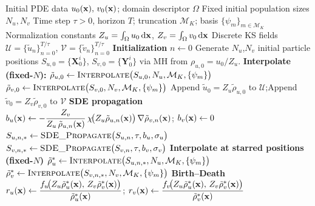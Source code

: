 \documentclass[preprint,12pt]{elsarticle}
\theoremstyle{definition}
\theoremstyle{remark}
\begin{document}
\begin{algorithm}
\caption{Stochastic Branching for keller--Segel equation}\label{alg:ks}
\begin{algorithmic}
\Require Initial PDE data $u_0(\mathbf{x}),\,v_0(\mathbf{x})$; domain descriptor $\Omega$
\Require Fixed initial population sizes $N_u, N_v$
\Require Time step $\tau>0$, horizon $T$; truncation $\mathcal M_K$; basis $\{\psi_m\}_{m\in\mathcal M_K}$
\Require Normalization constants $Z_u=\int_\Omega u_0\,\mathrm d\mathbf{x}$, $Z_v=\int_\Omega v_0\,\mathrm d\mathbf{x}$
\Ensure Discrete KS fields $\mathcal U=\{\tilde u_n\}_{n=0}^{T/\tau}$, $\mathcal V=\{\tilde v_n\}_{n=0}^{T/\tau}$
  \State \textbf{Initialization}
  \State $n\gets 0$
  \State Generate $N_u$,$N_v$ initial particle positions $S_{u,0}=\{\mathbf X^i_0\}$, $S_{v,0}=\{\mathbf Y^i_0\}$ via MH from $\rho_{u,0}=u_0/Z_u$.
  \State \textbf{Interpolate (fixed-$N$):}
  \State $\tilde\rho_{u,0} \gets \textsc{Interpolate}\big(S_{u,0},N_u,\mathcal M_K,\{\psi_m\}\big)$
  \State $\tilde\rho_{v,0} \gets \textsc{Interpolate}\big(S_{v,0},N_v,\mathcal M_K,\{\psi_m\}\big)$
  \State Append $\tilde u_0 = Z_u \tilde\rho_{u,0}$ to $\mathcal U$;\quad Append $\tilde v_0 = Z_v \tilde\rho_{v,0}$ to $\mathcal V$
    \State \textbf{SDE propagation}
    \State $b_u(\mathbf{x}) \gets -\dfrac{Z_v}{Z_u\,\tilde\rho_{u,n}(\mathbf{x})}\,\chi\!\big(Z_u\tilde\rho_{u,n}(\mathbf{x})\big)\,\nabla\tilde\rho_{v,n}(\mathbf{x})$; $b_v(\mathbf{x}) \gets 0$
    \State $S_{u,n,*} \gets \textsc{SDE\_Propagate}\big(S_{u,n},\tau,b_u,\sigma_u\big)$
    \State $S_{v,n,*} \gets \textsc{SDE\_Propagate}\big(S_{v,n},\tau,b_v,\sigma_v\big)$
    \State \textbf{Interpolate at starred positions (fixed-$N$)}
    \State $\tilde\rho_u^* \gets \textsc{Interpolate}\big(S_{u,n,*},N_u,\mathcal M_K,\{\psi_m\}\big)$
    \State $\tilde\rho_v^* \gets \textsc{Interpolate}\big(S_{v,n,*},N_v,\mathcal M_K,\{\psi_m\}\big)$
    \State \textbf{Birth--Death}
    \State $r_u(\mathbf{x}) \gets \dfrac{f_u\!\big(Z_u\tilde\rho_u^*(\mathbf{x}),\,Z_v\tilde\rho_v^*(\mathbf{x})\big)}{\tilde\rho_u^*(\mathbf{x})}$; $r_v(\mathbf{x}) \gets \dfrac{f_v\!\big(Z_u\tilde\rho_u^*(\mathbf{x}),\,Z_v\tilde\rho_v^*(\mathbf{x})\big)}{\tilde\rho_v^*(\mathbf{x})}$

\end{algorithmic}
\end{algorithm}
\end{document}
